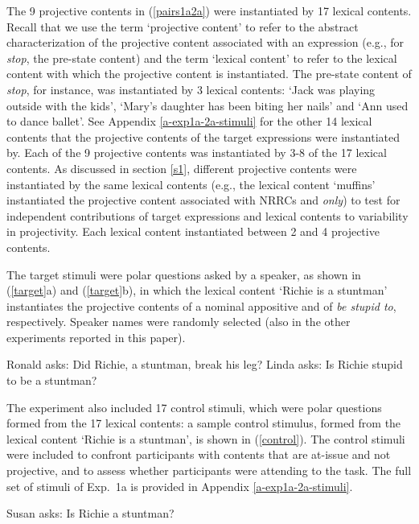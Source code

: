 \documentclass[11pt,fleqn]{article}
\newcommand{\6}{\mbox{$[\hspace*{-.6mm}[$}}
\newcommand{\9}{\mbox{$]\hspace*{-.6mm}]$}}
\newcommand{\sectionref}[1]{section \ref{#1}}
\begin{document}
The 9 projective contents in (\ref{pairs1a2a}) were instantiated by 17 lexical contents. Recall that we use the term `projective content' to refer to the abstract characterization of the projective content associated with an expression (e.g., for {\em stop}, the pre-state content) and the term `lexical content' to refer to the lexical content with which the projective content is instantiated. The pre-state content of {\em stop}, for instance, was instantiated by 3 lexical contents: `Jack was playing outside with the kids', `Mary's daughter has been biting her nails' and `Ann used to dance ballet'. See Appendix \ref{a-exp1a-2a-stimuli} for the other 14 lexical contents that the projective contents of the target expressions were instantiated by. Each of the 9 projective contents was instantiated by 3-8 of the 17 lexical contents. As discussed in \sectionref{s1}, different projective contents were instantiated by the same lexical contents (e.g., the lexical content `muffins' instantiated the projective content associated with NRRCs and {\em only}) to test for independent contributions of target expressions and lexical contents to variability in projectivity. Each lexical content instantiated between 2 and 4 projective contents.

The target stimuli were polar questions asked by a speaker, as shown in (\ref{target}a) and (\ref{target}b), in which the lexical content `Richie is a stuntman' instantiates the projective contents of a nominal appositive and of {\em be stupid to}, respectively. Speaker names were randomly selected (also in the other experiments reported in this paper).

\begin{exe}
\ex\label{target}
\begin{xlist}
\ex Ronald asks: Did Richie, a stuntman, break his leg?
\ex Linda asks: Is Richie stupid to be a stuntman?
\end{xlist}
\end{exe}

The experiment also included 17 control stimuli, which were polar questions formed from the 17 lexical contents: a sample control stimulus, formed from the lexical content `Richie is a stuntman', is shown in (\ref{control}). The control stimuli were included to confront participants with contents that are at-issue and not projective, and to assess whether participants were attending to the task. The full set of stimuli of Exp.~1a is provided in Appendix \ref{a-exp1a-2a-stimuli}.

\begin{exe}
\ex\label{control} Susan asks: Is Richie a stuntman?
\end{exe}
\end{document}
